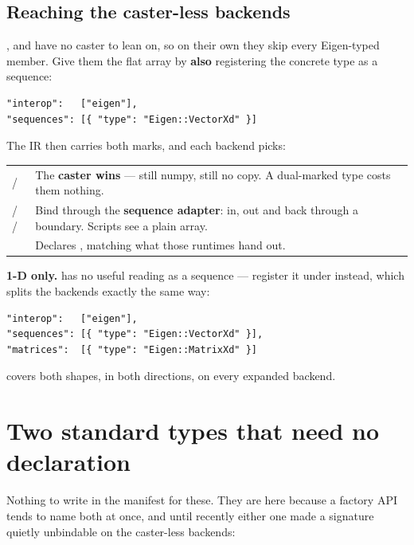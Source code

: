 \subsection{Reaching the caster-less backends}

,  and  have no caster to lean on, so on their
own they skip every Eigen-typed member. Give them the flat array by
\textbf{also} registering the concrete type as a sequence:

\begin{lstlisting}[style=json]
"interop":   ["eigen"],
"sequences": [{ "type": "Eigen::VectorXd" }]
\end{lstlisting}

The IR then carries both marks, and each backend picks:

\begin{center}
\small
\begin{tabular}{@{}lL{9.4cm}@{}}
\toprule
{} /  & The \textbf{caster wins} --- still numpy,
  still no copy. A dual-marked type costs them nothing. \\
 /  /  & Bind through the \textbf{sequence
  adapter}: in, out and back through a  boundary.
  Scripts see a plain array. \\
 & Declares , matching what those runtimes hand
  out. \\
\bottomrule
\end{tabular}
\end{center}

\textbf{1-D only.}  has no useful reading as a sequence ---
register it under  instead, which splits the backends exactly
the same way:

\begin{lstlisting}[style=json]
"interop":   ["eigen"],
"sequences": [{ "type": "Eigen::VectorXd" }],
"matrices":  [{ "type": "Eigen::MatrixXd" }]
\end{lstlisting}

covers both shapes, in both directions, on every expanded backend.

\section{Two standard types that need no declaration}

Nothing to write in the manifest for these. They are here because a factory API
tends to name both at once, and until recently either one made a signature
quietly unbindable on the caster-less backends:

